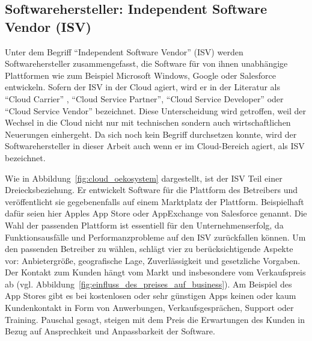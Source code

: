 
\subsection{Softwarehersteller: Independent Software Vendor (ISV)}
\label{cha:isv}
Unter dem Begriff "`Independent Software Vendor"' (ISV) werden 
Softwarehersteller zusammengefasst, die Software für von ihnen unabhängige Plattformen wie zum 
Beispiel Microsoft Windows, Google oder Salesforce entwickeln. Sofern der ISV 
in der Cloud agiert, wird er in der Literatur als "`Cloud Carrier"'
, "`Cloud Service Partner"', 
"`Cloud Service Developer"' 
 oder "`Cloud Service 
Vendor"'  bezeichnet. Diese 
Unterscheidung wird getroffen, weil der Wechsel in die Cloud nicht nur mit 
technischen sondern auch wirtschaftlichen Neuerungen einhergeht. Da sich noch 
kein Begriff durchsetzen konnte, wird der Softwarehersteller in dieser Arbeit 
auch wenn er im Cloud-Bereich agiert, als ISV bezeichnet.



Wie in Abbildung~\ref{fig:cloud_oekosystem} dargestellt, ist der ISV Teil einer 
Dreiecksbeziehung. Er entwickelt Software für die Plattform des Betreibers und 
veröffentlicht sie gegebenenfalls auf einem Marktplatz der Plattform. 
Beispielhaft dafür seien hier Apples App Store oder AppExchange von Salesforce 
genannt. Die Wahl der passenden Plattform ist essentiell für den 
Unternehmenserfolg, da Funktionsausfälle und Performanzprobleme auf den 
ISV zurückfallen können. Um den passenden Betreiber zu wählen, schlägt 
 vier zu berücksichtigende Aspekte 
vor: Anbietergröße, geografische Lage, Zuverlässigkeit und gesetzliche 
Vorgaben. \\

Der Kontakt zum Kunden hängt vom Markt und insbesondere vom Verkaufspreis ab 
(vgl. Abbildung~\ref{fig:einfluss_des_preises_auf_business}). Am Beispiel des 
App Stores gibt es bei kostenlosen oder sehr günstigen Apps keinen oder kaum 
Kundenkontakt in Form von Anwerbungen, Verkaufsgesprächen, Support oder  
Training. Pauschal gesagt, steigen mit dem Preis die Erwartungen des 
Kunden in Bezug auf Ansprechkeit und Anpassbarkeit der Software. 

